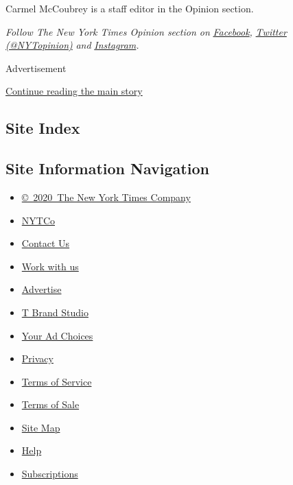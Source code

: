 Carmel McCoubrey is a staff editor in the Opinion section.

\emph{Follow The New York Times Opinion section on}
\href{https://www.facebook.com/nytopinion}{\emph{Facebook}}\emph{,}
\href{http://twitter.com/NYTOpinion}{\emph{Twitter (@NYTopinion)}}
\emph{and}
\href{https://www.instagram.com/nytopinion/}{\emph{Instagram}}\emph{.}

Advertisement

\protect\hyperlink{after-bottom}{Continue reading the main story}

\hypertarget{site-index}{%
\subsection{Site Index}\label{site-index}}

\hypertarget{site-information-navigation}{%
\subsection{Site Information
Navigation}\label{site-information-navigation}}

\begin{itemize}
\tightlist
\item
  \href{https://help.nytimes.com/hc/en-us/articles/115014792127-Copyright-notice}{©~2020~The
  New York Times Company}
\end{itemize}

\begin{itemize}
\tightlist
\item
  \href{https://www.nytco.com/}{NYTCo}
\item
  \href{https://help.nytimes.com/hc/en-us/articles/115015385887-Contact-Us}{Contact
  Us}
\item
  \href{https://www.nytco.com/careers/}{Work with us}
\item
  \href{https://nytmediakit.com/}{Advertise}
\item
  \href{http://www.tbrandstudio.com/}{T Brand Studio}
\item
  \href{https://www.nytimes.com/privacy/cookie-policy\#how-do-i-manage-trackers}{Your
  Ad Choices}
\item
  \href{https://www.nytimes.com/privacy}{Privacy}
\item
  \href{https://help.nytimes.com/hc/en-us/articles/115014893428-Terms-of-service}{Terms
  of Service}
\item
  \href{https://help.nytimes.com/hc/en-us/articles/115014893968-Terms-of-sale}{Terms
  of Sale}
\item
  \href{https://spiderbites.nytimes.com}{Site Map}
\item
  \href{https://help.nytimes.com/hc/en-us}{Help}
\item
  \href{https://www.nytimes.com/subscription?campaignId=37WXW}{Subscriptions}
\end{itemize}
